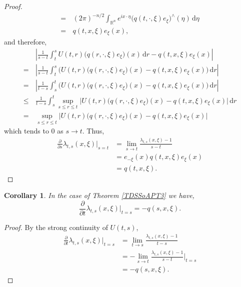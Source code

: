 \documentclass[a4paper, 12pt]{report}
\newtheorem{cor}[theorem]{Corollary}
\theoremstyle{cor}
\theoremstyle{remark}
\theoremstyle{definition}
\begin{document}
\begin{proof}
$$\begin{aligned}
= & \, (2\pi)^{-n/2}\int_{\mathbb{R}^n}e^{ix\cdot\eta}\big(q(t, \cdot, \xi)e_\xi\big)^\wedge(\eta)\,\mathrm{d}\eta\\
= & \, q(t, x, \xi)e_\xi(x),
\end{aligned}
$$
and therefore,
$$
\begin{aligned}
& \, \left|\frac{1}{s - t}\int_t^sU(t, r)\big(q(r, \cdot, \xi)e_\xi\big)(x)\,\mathrm{d}r - q(t, x, \xi)e_\xi(x)\right|\\
= & \, \left|\frac{1}{s - t}\int_t^s\Big(U(t, r)\big(q(r, \cdot, \xi)e_\xi\big)(x) - q(t, x, \xi)e_\xi(x)\Big)\,\mathrm{d}r\right|\\
= & \, \left|\frac{1}{t - s}\int_s^t\Big(U(t, r)\big(q(r, \cdot, \xi)e_\xi\big)(x) - q(t, x, \xi)e_\xi(x)\Big)\,\mathrm{d}r\right|\\
\le & \, \frac{1}{t - s}\int_s^t\sup_{s \le r \le t}\Big|U(t, r)\big(q(r, \cdot, \xi)e_\xi\big)(x) - q(t, x, \xi)e_\xi(x)\Big|\,\mathrm{d}r\\
= & \, \sup_{s \le r \le t}\Big|U(t, r)\big(q(r, \cdot, \xi)e_\xi\big)(x) - q(t, x, \xi)e_\xi(x)\Big|
\end{aligned}
$$
which tends to $0$ as $s \to t$.  Thus,
$$
\begin{aligned}
\frac{\partial}{\partial s}\lambda_{t, s}(x, \xi)\bigg|_{s = t} & = \lim_{s \to t}\frac{\lambda_{t, s}(x, \xi) - 1}{s - t}\\
& = e_{-\xi}(x)q(t, x, \xi)e_\xi(x)\\
& = q(t, x, \xi).
\end{aligned}
$$
\end{proof}
\begin{cor}
In the case of Theorem \ref{TDSSoAPT3} we have,
\begin{equation}
\frac{\partial}{\partial t}\lambda_{t, s}(x, \xi)\bigg|_{t = s} = -q(s, x, \xi).
\end{equation}
\end{cor}
\begin{proof}
By the strong continuity of $U(t, s)$,
$$
\begin{aligned}
\frac{\partial}{\partial t}\lambda_{t, s}(x, \xi)\bigg|_{t = s} & = \lim_{t \to s}\frac{\lambda_{t, s}(x, \xi) - 1}{t - s}\\
& = -\lim_{s \to t}\frac{\lambda_{t, s}(x, \xi) - 1}{s - t}\bigg|_{t = s}\\
& = -q(s, x, \xi).
\end{aligned}
$$
\end{proof}

\newpage\null
\end{document}
